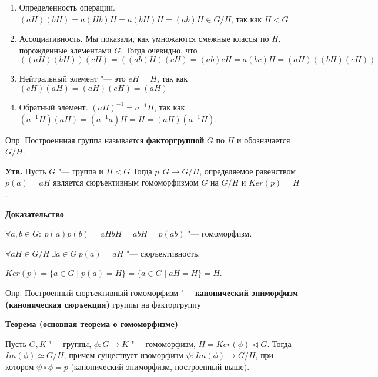 \documentclass{article}
\begin{document}
\begin{enumerate}
	\item Определенность операции. $(aH)(bH) = a(Hb)H = a(bH)H = (ab)H \in G/H$, так как $H \triangleleft G$
	\item Ассоциативность. Мы показали, как умножаются смежные классы по $H$, порожденные элементами $G$. Тогда очевидно, что $((aH)(bH))(cH) = ((ab)H)(cH) = (ab)cH = a(bc)H = (aH)((bH)(cH))$
	\item Нейтральный элемент "--- это $eH = H$, так как $(eH)(aH) = (aH)(eH) = (aH)$
	\item Обратный элемент. $(aH)^{-1} = a^{-1}H$, так как $(a^{-1}H)(aH) = (a^{-1}a)H = H = (aH)(a^{-1}H)$.
\end{enumerate}

\vspace{10pt}

\underline{Опр.} Построеннная группа называется \textbf{факторгруппой} $G$ по $H$ и обозначается $G/H$.

\vspace{10pt}

\textbf{Утв.}
Пусть $G$ "--- группа и $H \triangleleft G$
Тогда $p: G \rightarrow G/H$, определяемое равенством $p(a) = aH$ является сюръективным гомоморфизмом $G$ на $G/H$ и $Ker(p) = H$.

\vspace{5pt}

\textbf{Доказательство}

$\forall a, b \in G: \  p(a)p(b) = aHbH = abH = p(ab)$ "--- гомоморфизм. 

$\forall aH \in G/H \  \exists a \in G \  p(a) = aH$ "--- сюръективность.

$Ker(p) = \{a \in G \mid p(a) = H\} = \{a \in G \mid aH = H\} = H$.

\vspace{10pt}

\underline{Опр.} Построенный сюръективный гомоморфизм "--- \textbf{канонический эпиморфизм (каноническая сюръекция)} группы на факторгруппу

\vspace{10pt}

\textbf{Теорема (основная теорема о гомоморфизме)}

Пусть $G, K$ "--- группы, $\phi: G \rightarrow K$ "--- гомоморфизм, $H = Ker(\phi) \triangleleft G$. Тогда $Im(\phi) \simeq G/H$, причем существует изоморфизм $\psi: Im(\phi) \rightarrow G/H$, при котором $\psi \circ \phi = p$ (канонический эпиморфизм, построенный выше).
\end{document}
